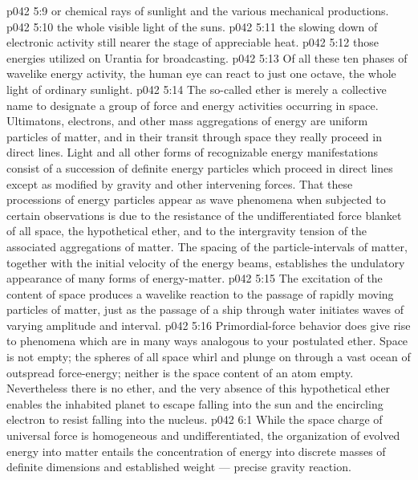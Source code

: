 \vs p042 5:9 \pc {}\bibnobreakspace {} or chemical rays of sunlight and the various mechanical productions.
\vs p042 5:10 \pc {}\bibnobreakspace {} the whole visible light of the suns.
\vs p042 5:11 \pc {}\bibnobreakspace {} the slowing down of electronic activity still nearer the stage of appreciable heat.
\vs p042 5:12 \pc {}\bibnobreakspace {} those energies utilized on Urantia for broadcasting.
\vs p042 5:13 \pc Of all these ten phases of wavelike energy activity, the human eye can react to just one octave, the whole light of ordinary sunlight.
\vs p042 5:14 \pc The so\hyp{}called ether is merely a collective name to designate a group of force and energy activities occurring in space. Ultimatons, electrons, and other mass aggregations of energy are uniform particles of matter, and in their transit through space they really proceed in direct lines. Light and all other forms of recognizable energy manifestations consist of a succession of definite energy particles which proceed in direct lines except as modified by gravity and other intervening forces. That these processions of energy particles appear as wave phenomena when subjected to certain observations is due to the resistance of the undifferentiated force blanket of all space, the hypothetical ether, and to the intergravity tension of the associated aggregations of matter. The spacing of the particle\hyp{}intervals of matter, together with the initial velocity of the energy beams, establishes the undulatory appearance of many forms of energy\hyp{}matter.
\vs p042 5:15 The excitation of the content of space produces a wavelike reaction to the passage of rapidly moving particles of matter, just as the passage of a ship through water initiates waves of varying amplitude and interval.
\vs p042 5:16 Primordial\hyp{}force behavior does give rise to phenomena which are in many ways analogous to your postulated ether. Space is not empty; the spheres of all space whirl and plunge on through a vast ocean of outspread force\hyp{}energy; neither is the space content of an atom empty. Nevertheless there is no ether, and the very absence of this hypothetical ether enables the inhabited planet to escape falling into the sun and the encircling electron to resist falling into the nucleus.
\vs p042 6:1 While the space charge of universal force is homogeneous and undifferentiated, the organization of evolved energy into matter entails the concentration of energy into discrete masses of definite dimensions and established weight --- precise gravity reaction.
